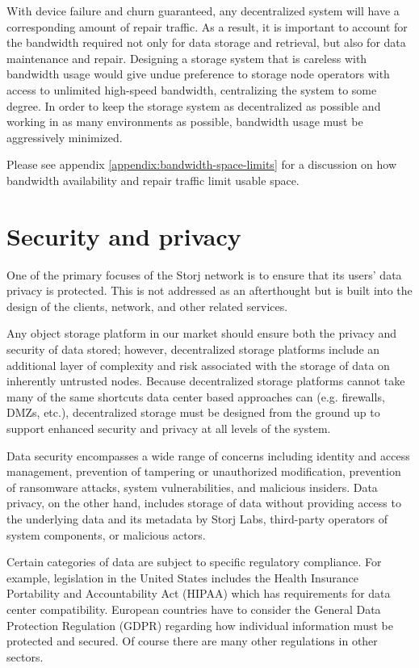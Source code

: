 \documentclass[11pt,fleqn,openany]{book}
\begin{document}
With device failure and churn guaranteed, any decentralized system will have a
corresponding amount of repair traffic. As a result, it is important to account
for the bandwidth required not only for data storage and retrieval, but also
for data maintenance and repair. Designing a
storage system that is careless with bandwidth usage would give undue
preference to storage node operators with access to unlimited high-speed
bandwidth, centralizing the system to some degree. In order to keep the storage
system as decentralized as possible and working in as many environments
as possible, bandwidth usage must be aggressively minimized.

Please see appendix \ref{appendix:bandwidth-space-limits} for a discussion on how
bandwidth availability and repair traffic limit usable space.

\section{Security and privacy}

One of the primary focuses of the Storj network is to ensure that its users'
data privacy is protected. This is not addressed as an afterthought but is
built into the design of the clients, network, and other related services.

Any object storage platform in our market should ensure both the privacy and
security of data stored; however,
decentralized storage platforms include an additional layer of
complexity and risk associated with the storage of data on inherently
untrusted nodes. Because decentralized storage platforms cannot take many
of the same shortcuts data center based approaches can (e.g. firewalls, DMZs,
etc.), decentralized storage must be designed from the ground up to support
enhanced security and privacy at all levels of the system.

Data security encompasses a wide range of concerns including
identity and access management, prevention of tampering or unauthorized
modification, prevention of ransomware attacks, system vulnerabilities, and
malicious insiders. Data privacy, on the other hand, includes storage of data
without providing access to the underlying data and its metadata by
Storj Labs, third-party operators of system components, or malicious actors.

Certain categories of data are subject to specific regulatory compliance.
For example, legislation in the United States includes
the Health Insurance Portability and
Accountability Act (HIPAA) which has requirements for data center
compatibility. European countries have to consider the General Data Protection
Regulation (GDPR) regarding
how individual information must be protected and secured. Of course there
are many other regulations in other sectors.
\end{document}
